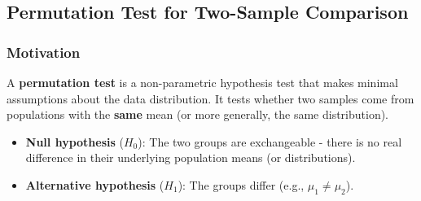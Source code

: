 \documentclass[10pt, total={6in, 8in}]{extarticle}
\begin{document}
\subsection{Permutation Test for Two-Sample Comparison}

\subsubsection{Motivation}
A \textbf{permutation test} is a non-parametric hypothesis test that makes minimal assumptions about the data distribution. It tests whether two samples come from populations with the \textbf{same} mean (or more generally, the same distribution).
\begin{itemize}
    \item \textbf{Null hypothesis} ($H_0$): The two groups are exchangeable - there is no real difference in their underlying population means (or distributions).
    \item \textbf{Alternative hypothesis} ($H_1$): The groups differ (e.g., $\mu_1 \neq \mu_2$).
\end{itemize}
\end{document}

